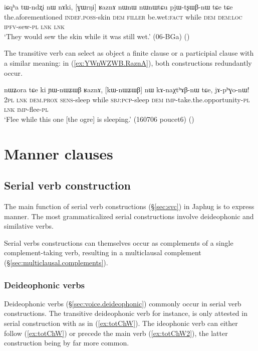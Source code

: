\begin{exe}
\ex \label{ex:GWrNi.RaznA}
\gll iɕqʰa tɯ-ndʐi nɯ nɤki, [ɣɯrŋi] ʁaznɤ nɯnɯ nɯnɯtɕu pjɯ-tʂɯβ-nɯ tɕe tɕe \\
the.aforementioned \textsc{indef}.\textsc{poss}-skin \textsc{dem} \textsc{filler} be.wet:\textsc{fact} while \textsc{dem} \textsc{dem}:\textsc{loc} \textsc{ipfv}-sew-\textsc{pl} \textsc{lnk} \textsc{lnk} \\
\glt `They would sew the skin while it was still wet.' (06-BGa)
()
\end{exe}

The transitive verb  can select as object a finite clause or a participial clause with a similar meaning: in  (\ref{ex:YWnWZWB.RaznA}), both constructions redundantly occur. 

\begin{exe}
\ex \label{ex:YWnWZWB.RaznA}
\gll  nɯʑora tɕe ki ɲɯ-nɯʑɯβ ʁaznɤ, [kɯ-nɯʑɯβ] nɯ kɤ-naχtʰɤβ-nɯ tɕe, jɤ-pʰɣo-nɯ! \\
\textsc{2pl} \textsc{lnk} \textsc{dem}.\textsc{prox} \textsc{sens}-sleep while \textsc{sbj}:\textsc{pcp}-sleep \textsc{dem} \textsc{imp}-take.the.opportunity-\textsc{pl} \textsc{lnk} \textsc{imp}-flee-\textsc{pl} \\
\glt `Flee while this one [the ogre] is sleeping.' (160706 poucet6)
()
\end{exe}
 


\section{Manner clauses} \label{sec:manner.clauses}

\subsection{Serial verb construction} \label{sec:svc.manner}
The main function of serial verb constructions (§\ref{sec:svc}) in Japhug is to express manner. The most grammaticalized serial constructions involve deideophonic and similative verbs.


Serial verbs constructions can themselves occur as complements of a single complement-taking verb, resulting in a multiclausal complement (§\ref{sec:multiclausal.complements}).

\subsubsection{Deideophonic verbs} \label{sec:svc.deideophonic}
Deideophonic verbs (§\ref{sec:voice.deideophonic}) commonly occur in serial verb constructions. The transitive deideophonic verb  for instance, is only attested in serial construction with  as in (\ref{ex:totChW}). The ideophonic verb can either follow (\ref{ex:totChW}) or precede the main verb (\ref{ex:totChW2}), the latter construction being by far more common. 

